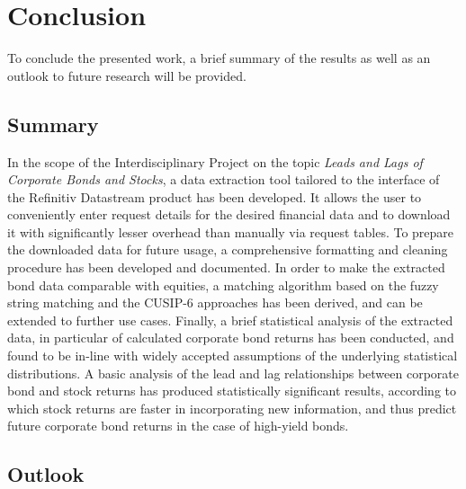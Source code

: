 \chapter{Conclusion} \label{chapter:Conclusion}
To conclude the presented work, a brief summary of the results as well as an outlook to future research will be provided. 

\section{Summary}
In the scope of the Interdisciplinary Project on the topic \textit{Leads and Lags of Corporate Bonds and Stocks}, a data extraction tool tailored to the interface of the Refinitiv Datastream product has been developed. It allows the user to conveniently enter request details for the desired financial data and to download it with significantly lesser overhead than manually via request tables. To prepare the downloaded data for future usage, a comprehensive formatting and cleaning procedure has been developed and documented. In order to make the extracted bond data comparable with equities, a matching algorithm based on the fuzzy string matching and the CUSIP-6 approaches has been derived, and can be extended to further use cases. Finally, a brief statistical analysis of the extracted data, in particular of calculated corporate bond returns has been conducted, and found to be in-line with widely accepted assumptions of the underlying statistical distributions. A basic analysis of the lead and lag relationships between corporate bond and stock returns has produced statistically significant results, according to which stock returns are faster in incorporating new information, and thus predict future corporate bond returns in the case of high-yield bonds. 

\section{Outlook}
